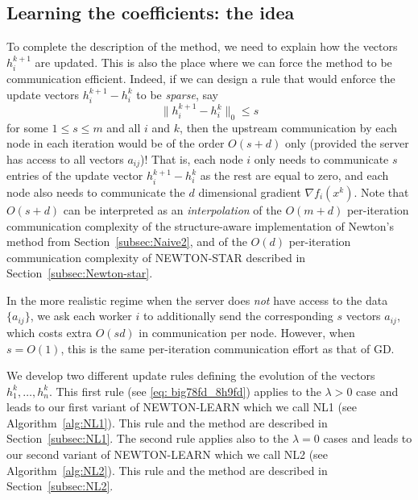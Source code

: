 \documentclass[10pt]{article}
\begin{document}
\subsection{Learning the coefficients: the idea}
To complete the description of the method, we need to explain how the vectors $h_i^{k+1}$ are updated. This is also the place where we can force the method to be communication efficient. Indeed, if we can design a rule that would enforce the update vectors $h_i^{k+1}-h_i^k$ to be {\em sparse}, say \begin{equation}\label{eq:sparse_update}\|h_i^{k+1}-h_i^k\|_0 \leq s \end{equation} for some $1 \leq s \leq m$ and all $i$ and $k$, then  the upstream communication by each node in each iteration would be of the order $O(s+d)$ only (provided the server has access to all vectors $a_{ij}$)! That is, each node $i$ only needs to communicate $s$ entries of the update vector $h_i^{k+1}-h_i^k$ as the rest are equal to zero, and each node also needs to communicate the $d$ dimensional gradient $\nabla f_i(x^k)$.  Note that $O(s+d)$ can be interpreted as an {\em interpolation} of the $O(m+d)$   per-iteration communication complexity  of the structure-aware implementation of Newton's method from  Section~\ref{subsec:Naive2}, and of the  $O(d)$   per-iteration communication complexity  of {\sf NEWTON-STAR} described in   Section~\ref{subsec:Newton-star}. 

In the more realistic regime when the server does {\em not} have access to the data $\{a_{ij}\}$, we ask each worker $i$ to additionally send the corresponding $s$ vectors $a_{ij}$, which costs extra $O(s d)$ in communication per node. However, when $s=O(1)$, this is the same per-iteration communication effort as that of GD.

We develop two different update rules defining the evolution of the vectors $h_1^k, \dots, h_n^k$. This first rule (see \eqref{eq: big78fd_8h9fd}) applies to the $\lambda>0$ case and leads to our first variant of {\sf NEWTON-LEARN} which we call {\sf NL1} (see Algorithm~\ref{alg:NL1}). This rule and the method are described in Section~\ref{subsec:NL1}. The second rule applies also to the $\lambda=0$ cases and leads to our second variant of {\sf NEWTON-LEARN} which we call {\sf NL2} (see Algorithm~\ref{alg:NL2}). This rule and the method are described in Section~\ref{subsec:NL2}. 
\end{document}
